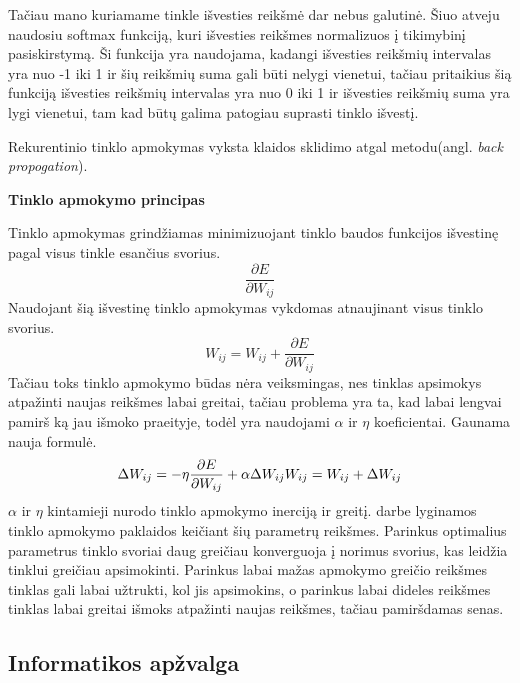 Tačiau mano kuriamame tinkle išvesties reikšmė dar nebus galutinė. Šiuo atveju naudosiu softmax funkciją, kuri išvesties reikšmes normalizuos į tikimybinį pasiskirstymą. Ši funkcija yra naudojama, kadangi išvesties reikšmių intervalas yra nuo -1 iki 1 ir šių reikšmių suma gali būti nelygi vienetui, tačiau pritaikius šią funkciją išvesties reikšmių intervalas yra nuo 0 iki 1 ir išvesties reikšmių suma yra lygi vienetui, tam kad būtų galima patogiau suprasti tinklo išvestį.

Rekurentinio tinklo apmokymas vyksta klaidos sklidimo atgal metodu(angl. \textit{back propogation}).

\textbf{Tinklo apmokymo principas}

Tinklo apmokymas grindžiamas minimizuojant tinklo baudos funkcijos išvestinę pagal visus tinkle esančius svorius.
    \begin{equation*}
      \frac{\partial E}{\partial W_{ij}}
    \end{equation*}
Naudojant šią išvestinę tinklo apmokymas vykdomas atnaujinant visus tinklo svorius.
    \begin{equation*}
      W_{ij} = W_{ij} + \frac{\partial E}{\partial W_{ij}}
    \end{equation*}
Tačiau toks tinklo apmokymo būdas nėra veiksmingas, nes tinklas apsimokys atpažinti naujas reikšmes labai greitai, tačiau problema yra ta, kad labai lengvai pamirš ką jau išmoko praeityje, todėl yra naudojami $\alpha$ ir $\eta$ koeficientai. Gaunama nauja formulė.
\begin{equation*}
  \Delta W_{ij} =-\eta\frac{\partial E}{\partial W_{ij}}+\alpha \Delta W_{ij} \\
    W_{ij} = W_{ij} + \Delta W_{ij}
\end{equation*}
$\alpha$ ir $\eta$ kintamieji nurodo tinklo apmokymo inerciją ir greitį. \cite{Deividas2018} darbe lyginamos tinklo apmokymo paklaidos keičiant šių parametrų reikšmes. Parinkus optimalius parametrus tinklo svoriai daug greičiau konverguoja į norimus svorius, kas leidžia tinklui greičiau apsimokinti. Parinkus labai mažas apmokymo greičio reikšmes tinklas gali labai užtrukti, kol jis apsimokins, o parinkus labai dideles reikšmes tinklas labai greitai išmoks atpažinti naujas reikšmes, tačiau pamiršdamas senas.


\subsection{ Informatikos apžvalga}


